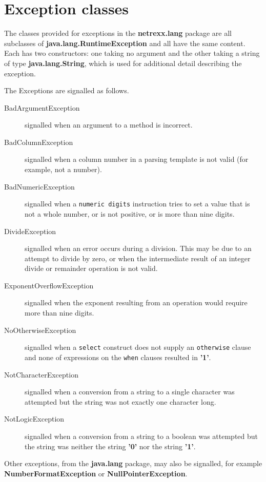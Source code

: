 \chapter{Exception classes}\label{refnlexcep}
 
The classes provided for exceptions in the \textbf{netrexx.lang} package
are all subclasses of \textbf{java.lang.RuntimeException} and all have
the same content.  Each has two constructors: one taking no argument and
the other taking a string of type \textbf{java.lang.String}, which is
used for additional detail describing the exception.
 
The Exceptions are signalled as follows.
\begin{description}
\item[BadArgumentException]\label{refexpbae}
 signalled when an argument to a method is incorrect.
\item[BadColumnException]\label{refexpbce}
 signalled when a column number in a parsing template is not valid
(for example, not a number).
\item[BadNumericException]\label{refexpbne}
 signalled when a \texttt{numeric digits} instruction tries to set
a value that is not a whole number, or is not positive, or is more than
nine digits.
\item[DivideException]\label{refexpdve}
 signalled when an error occurs during a division.  This may be due
to an attempt to divide by zero, or when the intermediate result of an
integer divide or remainder operation is not valid.
\item[ExponentOverflowException]\label{refexpeoe}
 signalled when the exponent resulting from an operation would
require more than nine digits.
\item[NoOtherwiseException]\label{refexpnoe}
 signalled when a \texttt{select} construct does not supply an
\texttt{otherwise} clause and none of expressions on the \texttt{when}
clauses resulted in \textbf{'1'}.
\item[NotCharacterException]\label{refexpnce}
 signalled when a conversion from a string to a single character was
attempted but the string was not exactly one character long.
\item[NotLogicException]\label{refexpnle}
 signalled when a conversion from a string to a boolean was
attempted but the string was neither the string \textbf{'0'} nor the
string \textbf{'1'}.
\end{description}
 
Other exceptions, from the \textbf{java.lang} package, may also be
signalled, for example \textbf{NumberFormatException}
or \textbf{NullPointerException}.
